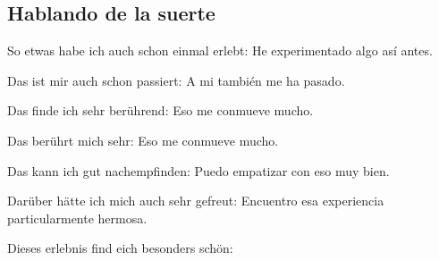 \subsection{Hablando de la suerte}
\begin{myitemize}
\item So etwas habe ich auch schon einmal erlebt: He experimentado algo así antes.
\item Das ist mir auch schon passiert: A mi también me ha pasado.
\item Das finde ich sehr berührend: Eso me conmueve mucho.
\item Das berührt mich sehr: Eso me conmueve mucho.
\item Das kann ich gut nachempfinden: Puedo empatizar con eso muy bien.
\item Darüber hätte ich mich auch sehr gefreut: Encuentro esa experiencia particularmente hermosa.
\item Dieses erlebnis find eich besonders schön:
\end{myitemize}